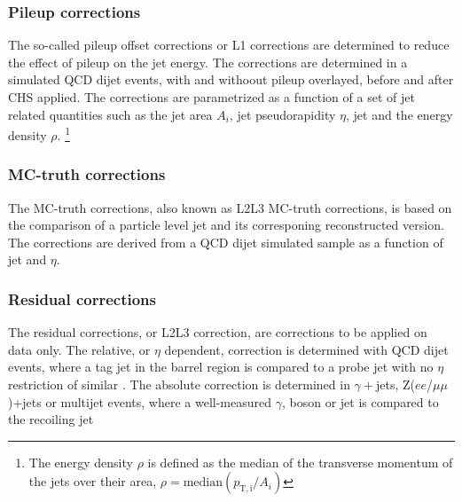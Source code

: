 \subsubsection*{Pileup corrections}
\noindent\justify
The so-called pileup offset corrections or L1 corrections are determined to reduce the effect of pileup on the jet energy. 
The corrections are determined in a simulated QCD dijet events, with and withoout pileup overlayed, before and after CHS applied. 
The corrections are parametrized as a function of a set of jet related quantities such as the jet area $A_{i}$, jet pseudorapidity $\eta$, jet \pt and the energy density $\rho$. \footnote{The energy density $\rho$ is defined as the median of the transverse momentum of the jets over their area, $\rho=\mathrm{median}(p_{\mathrm{T,i}}/ A_{i})$ } 
\subsubsection*{MC-truth corrections} 
\noindent\justify
The MC-truth corrections, also known as L2L3 MC-truth corrections, is based on the comparison of a particle level jet and its corresponing reconstructed version. 
The corrections are derived from a QCD dijet simulated sample as a function of jet \pt and $\eta$. 
\subsubsection*{Residual corrections}
\noindent\justify
The residual corrections, or L2L3 correction, are corrections to be applied on data only. 
The relative, or $\eta$ dependent, correction is determined with QCD dijet events, where a tag jet in the barrel region is compared to a probe jet with no $\eta$ restriction of similar \pt. 
The absolute correction is determined in $\gamma+$jets, Z($ee$/$\mu\mu$)+jets or multijet events, where a well-measured $\gamma$, \PZ boson or jet is compared to the recoiling jet 
